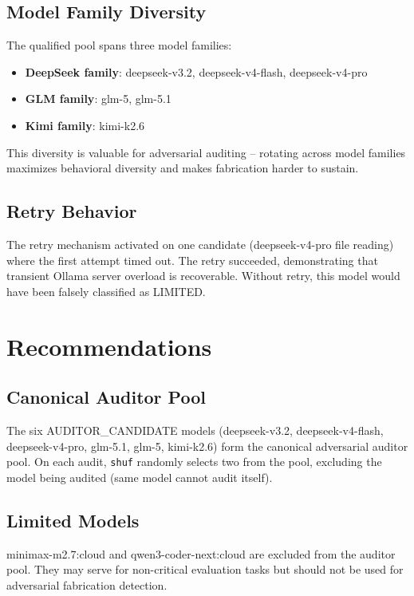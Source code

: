 \documentclass[11pt,a4paper]{article}
\begin{document}
\subsection{Model Family Diversity}

The qualified pool spans three model families:

\begin{itemize}
  \item \textbf{DeepSeek family}: deepseek-v3.2, deepseek-v4-flash, deepseek-v4-pro
  \item \textbf{GLM family}: glm-5, glm-5.1
  \item \textbf{Kimi family}: kimi-k2.6
\end{itemize}

This diversity is valuable for adversarial auditing -- rotating across model families maximizes behavioral diversity and makes fabrication harder to sustain.

\subsection{Retry Behavior}

The retry mechanism activated on one candidate (deepseek-v4-pro file reading) where the first attempt timed out. The retry succeeded, demonstrating that transient Ollama server overload is recoverable. Without retry, this model would have been falsely classified as LIMITED.

\section{Recommendations}

\subsection{Canonical Auditor Pool}

The six AUDITOR\_CANDIDATE models (deepseek-v3.2, deepseek-v4-flash, deepseek-v4-pro, glm-5.1, glm-5, kimi-k2.6) form the canonical adversarial auditor pool. On each audit, \texttt{shuf} randomly selects two from the pool, excluding the model being audited (same model cannot audit itself).

\subsection{Limited Models}

minimax-m2.7:cloud and qwen3-coder-next:cloud are excluded from the auditor pool. They may serve for non-critical evaluation tasks but should not be used for adversarial fabrication detection.
\end{document}
